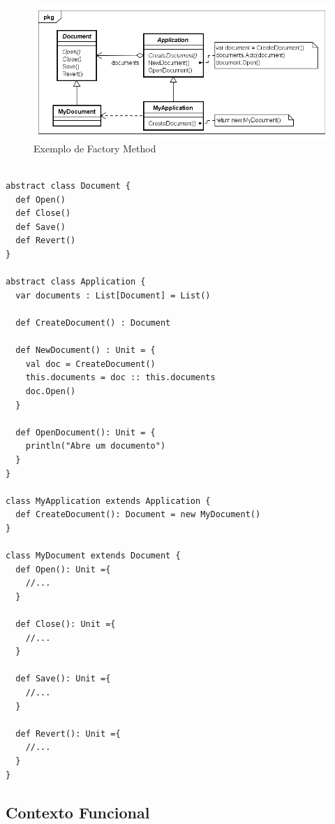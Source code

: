 \begin{figure}[htb]
	\caption{\label{fmethod_example}Exemplo de Factory Method}
	\begin{center}
	    \includegraphics[scale=0.5]{5_padroes-contexto-funcional/5.1_criacionais/5.1.1_factory-method/factorymethod_exemplo.png}
	\end{center}
\end{figure}

\begin{lstlisting}[caption={Factory Method Orientado a Objetos},label=oofactory]
    
abstract class Document {
  def Open()
  def Close()
  def Save()
  def Revert()
}

abstract class Application {
  var documents : List[Document] = List()

  def CreateDocument() : Document

  def NewDocument() : Unit = {
    val doc = CreateDocument()
    this.documents = doc :: this.documents
    doc.Open()
  }

  def OpenDocument(): Unit = {
    println("Abre um documento")
  }
}

class MyApplication extends Application {
  def CreateDocument(): Document = new MyDocument()
}

class MyDocument extends Document {
  def Open(): Unit ={
    //...
  }

  def Close(): Unit ={
    //...
  }

  def Save(): Unit ={
    //...
  }

  def Revert(): Unit ={
    //...
  }
}

\end{lstlisting}

\subsection*{Contexto Funcional}



\begin{lstlisting}[caption={Factory Method Funcional},label=fpfactory]
    


\end{lstlisting}

